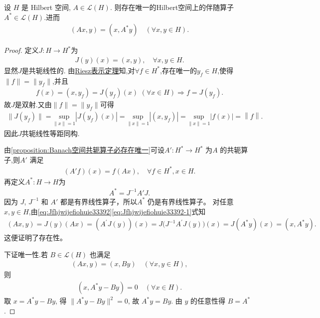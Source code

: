 \documentclass[../../main.tex]{subfiles}%
\begin{document}
\begin{proposition}\label{proposition:Hilbert空间有界线性算子必要唯一内积伴随的共轭算子}
设 $H$ 是 Hilbert 空间, $A\in\mathscr{L}(H)$. 则存在唯一的Hilbert空间上的伴随算子 $A^*\in\mathscr{L}(H)$.进而
\begin{align*}
(Ax,y)=(x,A^*y)\quad(\forall x,y\in H).
\end{align*}
\end{proposition}
\begin{proof}

定义\(J:H\to H^*\)为
\begin{align}\label{eq:Jfhjwijefiohuie33392}
J(y)(x)=(x,y),\quad \forall x,y\in H.
\end{align}
显然$J$是共轭线性的.
由\hyperref[theorem:Riesz表示定理(Hilbert空间)]{Riesz表示定理}知,对$\forall f\in H^*$,存在唯一的$y_f\in H$,使得$\|f\|=\|y_f\|$,并且
\begin{align*}
f(x) = (x,y_f) =J(y_f)(x)\,\,(\forall x\in H)\Longrightarrow f=J(y_f).
\end{align*}
故\(J\)是双射.又由$\|f\|=\|y_f\|$可得
\begin{align*}
\|J(y_f)\| = \underset{\left\| x \right\| =1}{\mathrm{sup}}\left| J\left( y_f \right) \left( x \right) \right|=\underset{\left\| x \right\| =1}{\mathrm{sup}}\left| \left( x,y_f \right) \right|=\underset{\left\| x \right\| =1}{\mathrm{sup}}\left| f\left( x \right) \right|=\left\| f \right\| .
\end{align*}
因此\(J\)共轭线性等距同构.

由\cref{proposition:Banach空间共轭算子必存在唯一}可设\(A':H^*\to H^*\) 为\(A\) 的共轭算子,则\(A'\) 满足
\begin{align}\label{eq:Jfhjwijefiohuie33392-1}
(A'f)(x)=f(Ax),\quad \forall f\in H^*, x\in H.
\end{align}
再定义$A^*:H\to H$为
\begin{align*}
A^*=J^{-1} A' J.
\end{align*}
因为 \(J\), \(J^{-1}\) 和 \(A'\) 都是有界线性算子，所以\(A^*\) 仍是有界线性算子。
对任意 \(x, y\in H\),由\eqref{eq:Jfhjwijefiohuie33392}\eqref{eq:Jfhjwijefiohuie33392-1}式知
\begin{align*}
(Ax,y)=J(y)(Ax)=(A^{\prime}J(y))(x)=J\bigl( J^{-1}A^{\prime}J(y) \bigr) (x)=J(A^*y)(x)=(x,A^*y).
\end{align*}
这便证明了存在性。

下证唯一性.若 $B\in\mathscr{L}(H)$ 也满足
\begin{align*}
(Ax,y)=(x,By)\quad(\forall x,y\in H),
\end{align*}
则
\begin{align*}
(x,A^*y-By)=0\quad(\forall x\in H).
\end{align*}
取 $x=A^*y-By$, 得 $\|A^*y-By\|^2=0$, 故 $A^*y=By$. 由 $y$ 的任意性得 $B=A^*$.
\end{proof}
\end{document}
